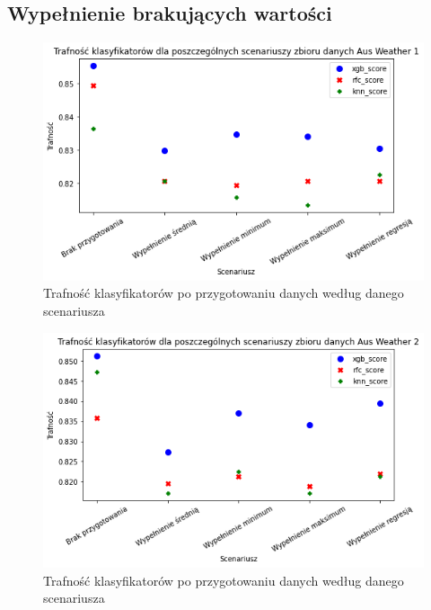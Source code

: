 \documentclass{book}
\begin{document}
\subsection{Wypełnienie brakujących wartości}
\begin{figure}[H]
\centerline{\includegraphics[scale=0.5]{Aus_Weather_1_Wypełnienie_brakujących}}
\centering
\caption{Trafność klasyfikatorów po przygotowaniu danych 
według danego scenariusza}
\end{figure}

\begin{figure}[H]
\centerline{\includegraphics[scale=0.5]{Aus_Weather_2_Wypełnienie_brakujących}}
\centering
\caption{Trafność klasyfikatorów po przygotowaniu danych 
według danego scenariusza}
\end{figure}
\end{document}
